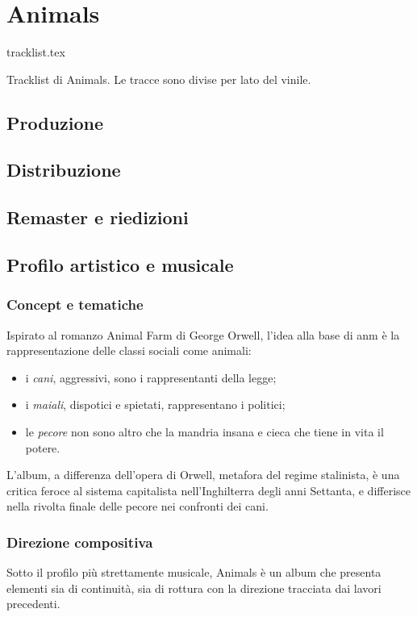 \documentclass[class=book, crop=false, oneside, 12pt]{standalone}
\begin{document}
    \chapter{Animals}
    \begin{table}[t]
        \centering
        {tracklist.tex}
        \caption{Tracklist di Animals. Le tracce sono divise per lato del vinile.}
        \label{tab:tracklist}
    \end{table}
    \section{Produzione}
    \section{Distribuzione}
    \section{Remaster e riedizioni}
    \section{Profilo artistico e musicale}

    \subsection{Concept e tematiche}
    \label{subsec:animals-concept}
    Ispirato al romanzo Animal Farm di George Orwell, l'idea alla base di \acrshort{anm} è la rappresentazione delle classi sociali come  animali: 
    \begin{itemize}
        \item i  \emph{cani}, aggressivi, sono i rappresentanti della legge;
        \item i  \emph{maiali}, dispotici e spietati, rappresentano i politici;
        \item le \emph{pecore} non sono altro che la mandria insana e cieca che tiene in vita il potere.
    \end{itemize}
    
    L'album, a differenza dell'opera di Orwell, metafora del regime stalinista, è una critica feroce al sistema capitalista nell'Inghilterra degli anni Settanta, e differisce nella rivolta finale delle pecore nei confronti dei cani.

    \subsection{Direzione compositiva}
    \label{subsec:animals-songwriting}
    Sotto il profilo più strettamente musicale, Animals è un album che presenta elementi sia di continuità, sia di rottura con la direzione tracciata dai lavori precedenti. 
    
\end{document}
